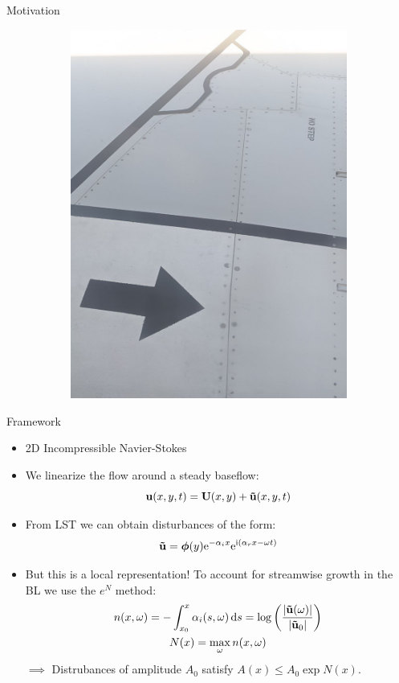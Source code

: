 \documentclass[aspectratio=43, xcolor=table]{beamer}
\begin{document}
\begin{frame}{Motivation}
\begin{figure}
\begin{subfigure}{0.45\textwidth}
			\includegraphics[width=\textwidth]{Images/wing_closer.jpg}
		\end{subfigure}

	\end{figure}
\end{frame}
\begin{frame}{Framework}

	\begin{itemize}
		\item 2D Incompressible Navier-Stokes
		\item We linearize the flow around a steady baseflow: $$\boldsymbol{\mathrm{u}}(x,y,t) = \boldsymbol{\mathrm{U}}(x,y)+ \boldsymbol{\mathrm{\tilde{u}}}(x,y,t)$$
		\item From LST we can obtain disturbances of the form: $$\boldsymbol{\mathrm{\tilde{u}}} = \boldsymbol{\mathrm{\phi}}(y) \mathrm{e}^{ -\alpha_i x } \mathrm{e}^{ \mathrm{i} (\alpha_r x - \omega t) }$$
		\item But this is a local representation! To account for streamwise growth in the BL we use the $e^N$ method:
		      \begin{gather*}
			      n(x, \omega) = -\int_{x_0}^{x} \alpha_i(s,\omega)\dd{s} = \log\left( \frac{\abs{\boldsymbol{\mathrm{\tilde{u}}}(\omega)}}{\abs{\boldsymbol{\mathrm{\tilde{u}}}_0}} \right) \\
			      N(x) = \max_{\omega} n(x, \omega)
		      \end{gather*}
		      $\implies$ Distrubances of amplitude $A_0$ satisfy $A(x) \leq A_0 \exp{N(x)}$.
	\end{itemize}

\end{frame}
\end{document}

